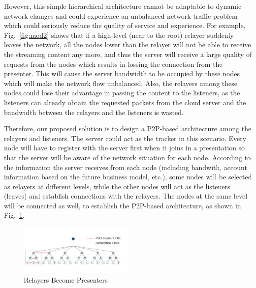 However, this simple hierarchical architecture cannot be adaptable to
dynamic network changes and could experience an unbalanced network
traffic problem which could seriously reduce the quality of service and
experience. For example, Fig.~\ref{fig:mod2} shows that if a
high-level (near to the root) relayer suddenly leaves the network, all the
nodes lower than the relayer will not be able to receive the streaming content
any more, and thus the server will receive a large quality of requests from the
nodes which results in lossing the connection from the presenter. This will cause the server
bandwidth to be occupied by these nodes which will make the network flow
unbalanced. Also, the relayers among these nodes could lose their advantage in
passing the content to the listeners, as the listeners can already obtain the
requested packets from the cloud server and the bandwidth between the relayers
and the listeners is wasted.

Therefore, our proposed solution is to design a P2P-based
architecture among the relayers
and listeners. The server could act as the tracker in this scenario. Every node
will have to register with the server first when it joins in a presentation so
that the server will be aware of the network situation for each node. According
to the information the server receives from each node (including bandwith,
account information based on the future business model, etc.), some nodes will
be selected as relayers at different levels, while the other nodes will act as
the listeners (leaves) and establish connections with the relayers. The nodes
at the same level will be connected as well, to establish the P2P-based
architecture, as shown in Fig.~\ref{fig:mod3}.


\begin{figure}[h!]
  \centering
      \includegraphics[width=0.5\textwidth]{figures/model3_test2.jpg}
  \caption{Relayers Become Presenters}
  \label{fig:mod3}
  \vspace{-0.15in}
\end{figure}


